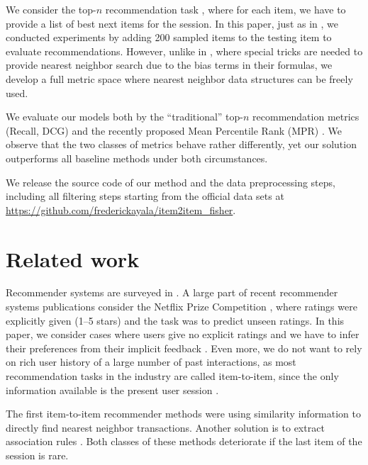 \documentclass[preprint]{sig-alternate-05-2015}
\begin{document}
We consider the top-$n$ recommendation task \cite{deshpande2004item}, where for each item, we have to provide a list of best next items for the session.
In this paper, just as in \cite{koenigstein2013towards}, we conducted experiments by adding 200 sampled items to the testing item to evaluate recommendations. 
However, unlike in \cite{koenigstein2013towards}, where special tricks are needed to provide nearest neighbor search due to the bias terms in their formulas, we develop a full metric space where nearest neighbor data structures can be freely used.

We evaluate our models both by the ``traditional'' top-$n$ recommendation metrics (Recall, DCG) and the recently proposed Mean Percentile Rank (MPR) \cite{hu2008collaborative}.
We observe that the two classes of metrics behave rather differently, yet our solution outperforms all baseline methods under both circumstances.

We release the source code of our method and the data preprocessing steps, including all filtering steps starting from the official data sets at 
\url{https://github.com/frederickayala/item2item_fisher}.


\section{Related work}

Recommender systems are surveyed in \cite{ricci2011introduction}.
A large part of recent recommender systems publications consider the Netflix Prize Competition  \cite{bennett2007netflix}, where ratings were explicitly given (1--5 stars) and the task was to predict unseen ratings.
In this paper, we consider cases where users give no explicit ratings and we have to infer their preferences from their implicit feedback \cite{koenigstein2013towards}.
Even more, we do not want to rely on rich user history of a large number of past interactions, as most recommendation tasks in the industry are called item-to-item, since the only information available is the present user session \cite{pilaszy2015neighbor}. 


The first item-to-item recommender methods \cite{sarwar01item,amazon-recommender} were using similarity information to directly find nearest neighbor \cite{desrosiers2011comprehensive} transactions. 
Another solution is to extract association rules \cite{davidson2010youtube}.
Both classes of these methods deteriorate if the last item of the session is rare.
\end{document}
